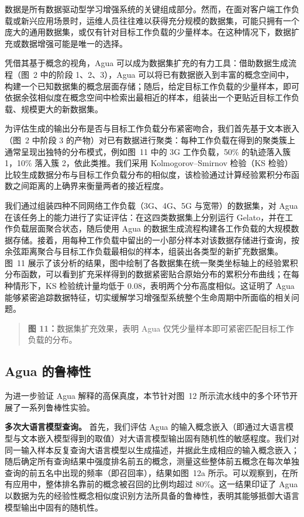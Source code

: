 \documentclass[11pt,a4paper]{article}
\begin{document}
数据是所有数据驱动型学习增强系统的关键组成部分。然而，在面对客户端工作负载或新兴应用场景时，运维人员往往难以获得充分规模的数据集，可能只拥有一个庞大的通用数据集，或仅有针对目标工作负载的少量样本。在这种情况下，数据扩充或数据增强可能是唯一的选择。

凭借其基于概念的视角，Agua 可以成为数据集扩充的有力工具：借助数据生成流程（图~2 中的阶段 1、2、3），Agua 可以将已有数据嵌入到丰富的概念空间中，构建一个已知数据集的概念层面存储；随后，给定目标工作负载的少量样本，即可依据余弦相似度在概念空间中检索出最相近的样本，组装出一个更贴近目标工作负载、规模更大的新数据集。

为评估生成的输出分布是否与目标工作负载分布紧密吻合，我们首先基于文本嵌入（图~2 中阶段 3 的产物）对已有数据进行聚类：每种工作负载在得到的聚类簇上通常呈现出独特的分布模式，例如图~11 中的 3G 工作负载，50\% 的轨迹落入簇 1，10\% 落入簇 2，依此类推。我们采用 Kolmogorov–Smirnov 检验（KS 检验）比较生成数据分布与目标工作负载分布的相似度，该检验通过计算经验累积分布函数之间距离的上确界来衡量两者的接近程度。

我们通过组装四种不同网络工作负载（3G、4G、5G 与宽带）的数据集，对 Agua 在该任务上的能力进行了实证评估：在这四类数据集上分别运行 Gelato，并在工作负载层面聚合状态，随后使用 Agua 的数据生成流程构建各工作负载的大规模数据存储。接着，用每种工作负载中留出的一小部分样本对该数据存储进行查询，按余弦距离聚合与目标工作负载最相似的样本，组装出各类型的新扩充数据集。图~11 展示了该分析的结果，图中绘制了各数据集在统一聚类坐标轴上的经验累积分布函数，可以看到扩充采样得到的数据紧密贴合原始分布的累积分布曲线；在每种情形下，KS 检验统计量均低于 0.08，表明两个分布高度相似。这证明了 Agua 能够紧密追踪数据特征，切实缓解学习增强型系统整个生命周期中所面临的相关问题。

\begin{quote}\small\noindent\textbf{图 11：}数据集扩充效果，表明 Agua 仅凭少量样本即可紧密匹配目标工作负载的分布。\end{quote}

\subsection{Agua 的鲁棒性}

为进一步验证 Agua 解释的高保真度，本节针对图~12 所示流水线中的多个环节开展了一系列鲁棒性实验。

\textbf{多次大语言模型查询。} 首先，我们评估 Agua 的输入概念嵌入（即通过大语言模型与文本嵌入模型得到的取值）对大语言模型输出固有随机性的敏感程度。我们对同一输入样本反复查询大语言模型以生成描述，并据此生成相应的输入概念嵌入；随后确定所有查询结果中强度排名前五的概念，测量这些整体前五概念在每次单独查询的前五名中出现的频率（即召回率），结果如图~12a 所示。可以观察到，在所有应用中，整体排名靠前的概念被召回的比例均超过 80\%。这一结果印证了 Agua 以数据为先的经验性概念相似度识别方法所具备的鲁棒性，表明其能够抵御大语言模型输出中固有的随机性。
\end{document}
